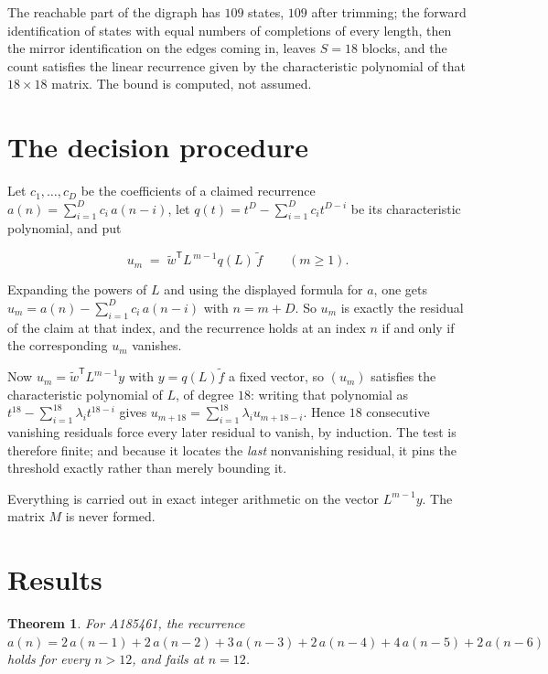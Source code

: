\documentclass[11pt]{article}
\newtheorem{theorem}{Theorem}
\theoremstyle{definition}
\begin{document}
The reachable part of the digraph has $109$ states, $109$ after trimming; the forward identification of states with equal numbers of completions of every length, then the mirror identification on the edges coming in, leaves $S = 18$ blocks, and the count satisfies the linear recurrence given by the characteristic polynomial of that $18\times18$ matrix. The bound is computed, not assumed.

\section{The decision procedure}

Let $c_1,\dots,c_D$ be the coefficients of a claimed recurrence $a(n) = \sum_{i=1}^{D} c_i\,a(n-i)$, let $q(t) = t^{D} - \sum_{i=1}^{D} c_i t^{D-i}$ be its characteristic polynomial, and put

\[u_m \;=\; \tilde w^{\mathsf T} L^{\,m-1} q(L)\,\tilde f \qquad (m \ge 1).\]

Expanding the powers of $L$ and using the displayed formula for $a$, one gets $u_m = a(n) - \sum_{i=1}^{D} c_i\,a(n-i)$ with $n = m + D$. So $u_m$ is exactly the residual of the claim at that index, and the recurrence holds at an index $n$ if and only if the corresponding $u_m$ vanishes.

Now $u_m = \tilde w^{\mathsf T} L^{m-1} y$ with $y = q(L)\tilde f$ a fixed vector, so $(u_m)$ satisfies the characteristic polynomial of $L$, of degree $18$: writing that polynomial as $t^{18} - \sum_{i=1}^{18} \lambda_i t^{18-i}$ gives $u_{m+18} = \sum_{i=1}^{18} \lambda_i u_{m+18-i}$. Hence $18$ consecutive vanishing residuals force every later residual to vanish, by induction. The test is therefore finite; and because it locates the {\itshape last} nonvanishing residual, it pins the threshold exactly rather than merely bounding it.

Everything is carried out in exact integer arithmetic on the vector $L^{m-1}y$. The matrix $M$ is never formed.

\section{Results}

\begin{theorem} For A185461, the recurrence $a(n) = 2\,a(n-1) + 2\,a(n-2) + 3\,a(n-3) + 2\,a(n-4) + 4\,a(n-5) + 2\,a(n-6)$ holds for every $n > 12$, and fails at $n = 12$.\end{theorem}
\end{document}
